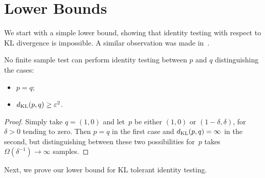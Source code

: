 \section{Lower Bounds}
\label{sec:lb}
We start with a simple lower bound, showing that identity testing with respect to KL divergence is impossible.
A similar observation was made in~\cite{BatuFRSW00}.
\begin{theorem}\label{thm:untestable}
No finite sample test can perform identity testing between $p$ and $q$ distinguishing the cases:
\begin{itemize}
\item $p = q$;
\item $d_{\mathrm {KL}}(p,q) \geq \varepsilon^2$.
\end{itemize}
\end{theorem}
\begin{proof}
Simply take $q = (1, 0)$ and let~$p$ be either $(1, 0)$ or $(1-\delta, \delta)$, for~$\delta > 0$ tending to zero.
Then $p = q$ in the first case and $d_{\mathrm {KL}}(p,q) = \infty$ in the second, but distinguishing between these two possibilities for~$p$
takes $\Omega(\delta^{-1})\rightarrow \infty$ samples.
\end{proof}

Next, we prove our lower bound for KL tolerant identity testing.

